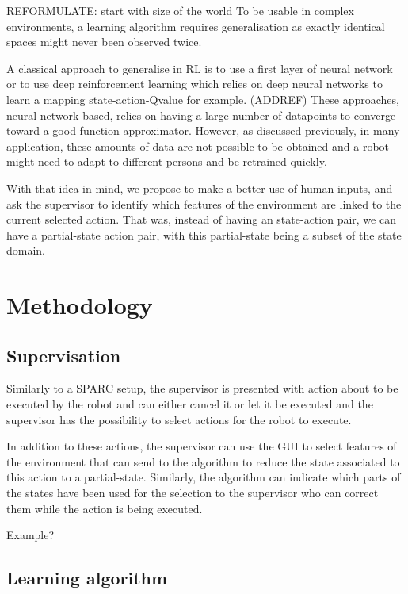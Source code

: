 \documentclass[letterpaper]{article} %
\begin{document}
REFORMULATE: start with size of the world
To be usable in complex environments, a
learning algorithm requires generalisation as exactly identical spaces might
never been observed twice.

A classical approach to generalise in RL is to use a first layer of neural
network or to use deep reinforcement learning which relies on deep neural
networks to learn a mapping state-action-Qvalue for example. (ADDREF)
These approaches, neural network based, relies on having a large number of
datapoints to converge toward a good function approximator. However, as
discussed previously, in many application, these amounts of data are not
possible to be obtained and a robot might need to adapt to different persons and
be retrained quickly.

With that idea in mind, we propose to make a better use of human inputs, and ask
 the supervisor to identify which features of the environment are linked to the
 current selected action. That was, instead of having an state-action pair, we
 can have a partial-state action pair, with this partial-state being a subset of
 the state domain.

\section{Methodology}

\subsection{Supervisation}
Similarly to a SPARC setup, the supervisor is presented with action about to be
executed by the robot and can either cancel it or let it be executed and the 
supervisor has the possibility to select actions for the robot to execute.

In addition to these actions, the supervisor can use the GUI to select features
of the environment that can send to the algorithm to reduce the state associated
to this action to a partial-state. Similarly, the algorithm can indicate which
parts of the states have been used for the selection to the supervisor who can
correct them while the action is being executed.

Example?

\subsection{Learning algorithm}
\end{document}
